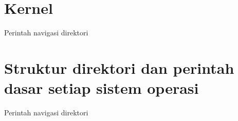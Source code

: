 \section{Kernel}
Perintah navigasi direktori

\section{Struktur direktori dan perintah dasar setiap sistem operasi}
Perintah navigasi direktori